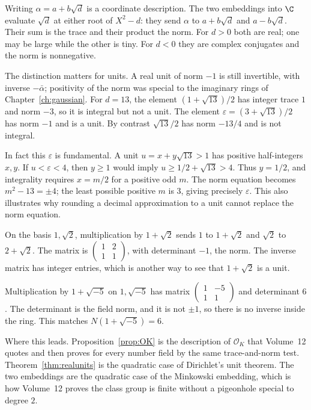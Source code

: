 Writing $\alpha=a+b\sqrt d$ is a coordinate description.
The two embeddings into $\C$ evaluate $\sqrt d$ at either root
of $X^2-d$: they send $\alpha$ to $a+b\sqrt d$ and $a-b\sqrt d$.
Their sum is the trace and their product the norm.
For $d>0$ both are real; one may be large while the other is tiny.
For $d<0$ they are complex conjugates and the norm is nonnegative.

The distinction matters for units. A real unit of norm $-1$ is still
invertible, with inverse $-\bar\alpha$; positivity of the norm was special
to the imaginary rings of Chapter~\ref{ch:gaussian}.
For $d=13$, the element $(1+\sqrt{13})/2$ has integer trace $1$ and norm
$-3$, so it is integral but not a unit. The element
$\varepsilon=(3+\sqrt{13})/2$ has norm $-1$ and is a unit.
By contrast $\sqrt{13}/2$ has norm $-13/4$ and is not integral.

In fact this $\varepsilon$ is fundamental. A unit $u=x+y\sqrt{13}>1$
has positive half-integers $x,y$. If $u<\varepsilon<4$, then
$y\ge1$ would imply $u\ge1/2+\sqrt{13}>4$.
Thus $y=1/2$, and integrality requires $x=m/2$ for a positive odd $m$.
The norm equation becomes $m^2-13=\pm4$; the least possible positive $m$
is $3$, giving precisely $\varepsilon$. This also illustrates why
rounding a decimal approximation to a unit cannot replace the norm equation.

\begin{examplex}
On the basis $1,\sqrt 2$, multiplication by $1+\sqrt 2$ sends $1$ to $1+\sqrt 2$ and $\sqrt 2$ to $2+\sqrt 2$. The matrix is $\begin{pmatrix}1&2\\1&1\end{pmatrix}$, with determinant $-1$, the norm. The inverse matrix has integer entries, which is another way to see that $1+\sqrt 2$ is a unit.
\end{examplex}

\begin{examplex}
Multiplication by $1+\sqrt{-5}$ on $1,\sqrt{-5}$ has matrix $\begin{pmatrix}1&-5\\1&1\end{pmatrix}$ and determinant $6$. The determinant is the field norm, and it is not $\pm 1$, so there is no inverse inside the ring. This matches $N(1+\sqrt{-5})=6$.
\end{examplex}

\begin{beauty}
Where this leads. Proposition~\ref{prop:OK} is the description of $\mathcal O_K$ that Volume~12 quotes and then proves for every number field by the same trace-and-norm test. Theorem~\ref{thm:realunits} is the quadratic case of Dirichlet's unit theorem. The two embeddings are the quadratic case of the Minkowski embedding, which is how Volume~12 proves the class group is finite without a pigeonhole special to degree $2$.
\end{beauty}

